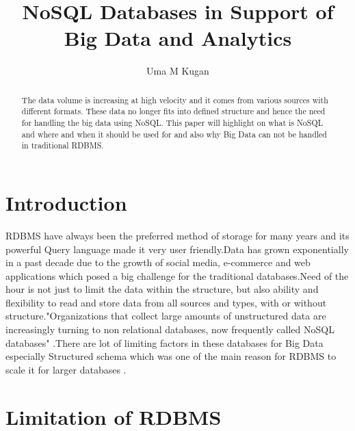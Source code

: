 \documentclass[sigconf]{acmart}
\begin{document}
\title{NoSQL Databases in Support of Big Data and Analytics}


\author{Uma M Kugan}

\renewcommand{\shortauthors}{Uma}


\begin{abstract}
The data volume is increasing at high velocity and it comes from various sources with different formats. These data no longer fits into defined structure and hence the need for handling the big data using NoSQL. This paper will highlight on what is NoSQL and where and when it should be used for and also why Big Data can not be handled in traditional RDBMS.
\end{abstract}



\maketitle

\section{Introduction}

RDBMS have always been the preferred method of storage for many years and its powerful Query language made it very user friendly.Data has grown exponentially in a past decade due to the growth of social media, e-commerce and web applications which posed a big challenge for the traditional databases.Need of the hour is not just to limit the data within the structure, but also ability and flexibility to read and store data from all sources and types, with or without structure."Organizations that collect large amounts of unstructured data are increasingly turning to non relational databases, now frequently called NoSQL databases" \cite{neal}.There are lot of limiting factors in these databases for Big Data especially Structured schema which was one of the main reason for RDBMS to scale it for larger databases \cite{aspire}.

\section{Limitation of RDBMS}
\end{document}
